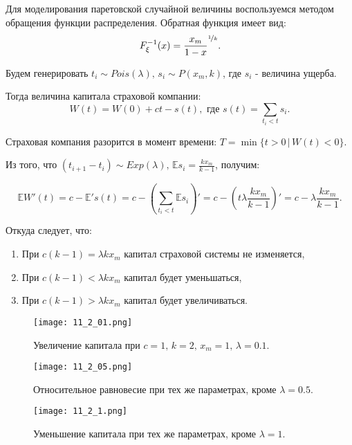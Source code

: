 \documentclass[a4paper, 11pt]{article}
\theoremstyle{def}
\theoremstyle{th}
\theoremstyle{rem}
\begin{document}
Для моделирования паретовской случайной величины воспользуемся методом обращения функции распределения. Обратная функция имеет вид:
$$
        F_{\xi}^{-1}(x)
        =
        \frac{x_m}{1-x}^{\nicefrac{1}{k}}.
$$

Будем генерировать $t_i \sim Pois(\lambda), \, s_i \sim P(x_m, k)$, где $s_i$ - величина ущерба.

Тогда величина капитала страховой компании: $$W(t) = W(0) + ct - s(t),\text{ где } s(t) = \sum\limits_{t_i<t}s_i.$$

Страховая компания разорится в момент времени: $T = \min\{t>0 \,|\, W(t) < 0\}$.

Из того, что $(t_{i+1}-t_i) \sim Exp(\lambda), \, \mathbb{E}s_i = \displaystyle\frac{k x_m}{k-1}$, получим:

$$\mathbb{E}W'(t) = c - \mathbb{E}'s(t) = c - \left(\sum\limits_{t_i<t} \mathbb{E}s_i\right)' = c - \left(t\lambda \frac{k x_m}{k-1}\right)' = c - \lambda \frac{k x_m}{k-1}.$$

Откуда следует, что:
\begin{enumerate}
    \item При $c(k-1) = \lambda k x_m$ капитал страховой системы не изменяется,
    \item При $c(k-1) < \lambda k x_m$ капитал будет уменьшаться,
    \item При $c(k-1) > \lambda k x_m$ капитал будет увеличиваться.
\end{enumerate}

\begin{figure}[h]
        \noindent
        \centering
        {
        \texttt{[image: 11\_2\_01.png]}}
        \caption{Увеличение капитала при $c = 1, \, k = 2, \, x_m = 1, \, \lambda = 0.1$.}
\end{figure}
\clearpage
\begin{figure}[t]
\noindent
        \centering
        {
        \texttt{[image: 11\_2\_05.png]}}
        \caption{Относительное равновесие при тех же параметрах, кроме $\lambda = 0.5$.}
\end{figure}
\begin{figure}[b]
\noindent
        \centering
        {
        \texttt{[image: 11\_2\_1.png]}}
        \caption{Уменьшение капитала при тех же параметрах, кроме $\lambda = 1$.}
\end{figure}
\end{document}
